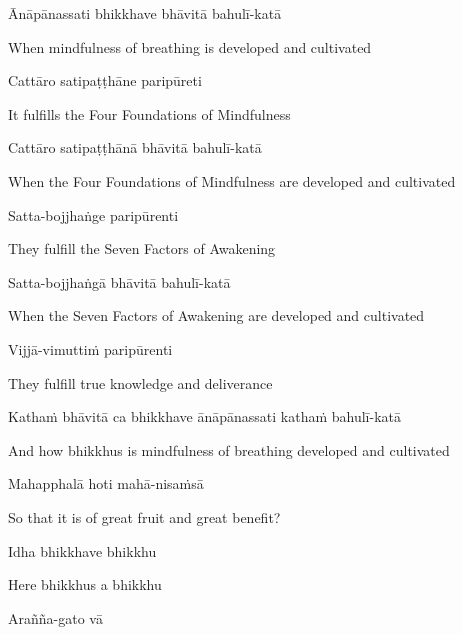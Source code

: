 Ānāpānassati bhikkhave bhāvitā bahulī-katā

\begin{cprenglish}
  When mindfulness of breathing is developed and cultivated
\end{cprenglish}

Cattāro satipaṭṭhāne paripūreti

\begin{cprenglish}
  It fulfills the Four Foundations of Mindfulness
\end{cprenglish}

Cattāro satipaṭṭhānā bhāvitā bahulī-katā

\begin{cprenglish}
  When the Four Foundations of Mindfulness are developed and cultivated
\end{cprenglish}

Satta-bojjhaṅge paripūrenti

\begin{cprenglish}
  They fulfill the Seven Factors of Awakening
\end{cprenglish}

Satta-bojjhaṅgā bhāvitā bahulī-katā

\begin{cprenglish}
  When the Seven Factors of Awakening are developed and cultivated
\end{cprenglish}

Vijjā-vimuttiṁ paripūrenti

\begin{cprenglish}
  They fulfill true knowledge and deliverance
\end{cprenglish}

Kathaṁ bhāvitā ca bhikkhave ānāpānassati kathaṁ bahulī-katā

\begin{cprenglish}
  And how bhikkhus is mindfulness of breathing developed and cultivated
\end{cprenglish}

Mahapphalā hoti mahā-nisaṁsā

\begin{cprenglish}
  So that it is of great fruit and great benefit?
\end{cprenglish}

Idha bhikkhave bhikkhu

\begin{cprenglish}
  Here bhikkhus a bhikkhu
\end{cprenglish}

Arañña-gato vā

